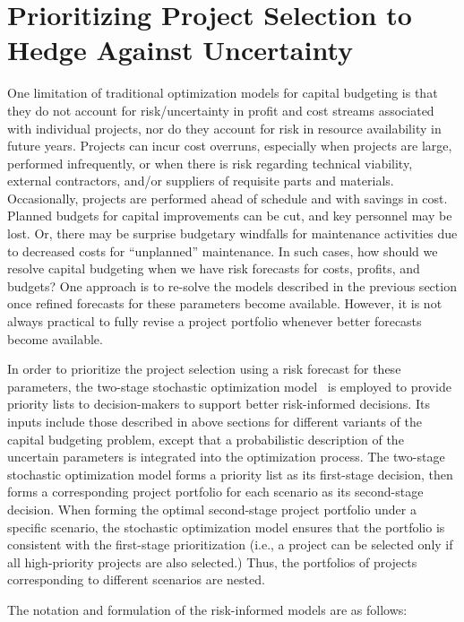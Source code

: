 \section{Prioritizing Project Selection to Hedge Against Uncertainty}
\label{sec:StochasticCapitalBudgeting}

One limitation of traditional optimization models for capital budgeting is that
they do not account for risk/uncertainty in profit and cost streams associated
with individual projects, nor do they account for risk in resource availability
in future years. Projects can incur cost overruns, especially when projects are
large, performed infrequently, or when there is risk regarding technical viability,
external contractors, and/or suppliers of requisite parts and materials.
Occasionally, projects are performed ahead of schedule and with savings in cost.
Planned budgets for capital improvements can be cut, and key personnel may be
lost. Or, there may be surprise budgetary windfalls for maintenance activities
due to decreased costs for “unplanned” maintenance. In such cases, how should
we resolve capital budgeting when we have risk forecasts for costs, profits, and
budgets? One approach is to re-solve the models described in the previous
section once refined forecasts for these parameters become available. However,
it is not always practical to fully revise a project portfolio whenever better
forecasts become available.

In order to prioritize the project selection using a risk forecast for these
parameters, the two-stage stochastic optimization model~\cite{PrioritizingProjectSelection} is employed to provide
priority lists to decision-makers to support better risk-informed decisions.
Its inputs include those described in above sections for different variants of
the capital budgeting problem, except that a probabilistic description of the
uncertain parameters is integrated into the optimization process. The two-stage
stochastic optimization model forms a priority list as its first-stage decision,
then forms a corresponding project portfolio for each scenario as its
second-stage decision. When forming the optimal second-stage project portfolio
under a specific scenario, the stochastic optimization model ensures that the
portfolio is consistent with the first-stage prioritization (i.e., a project can
be selected only if all high-priority projects are also selected.) Thus, the
portfolios of projects corresponding to different scenarios are nested.

The notation and formulation of the risk-informed models are as follows:

